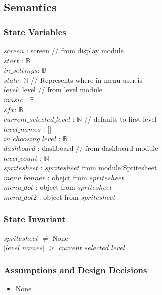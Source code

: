 \documentclass[12pt]{article}
\begin{document}
\subsection {Semantics}

\subsubsection {State Variables}

$screen$ : screen // from display module\\
$start$ : $\mathbb{B}$ \\
$in\_settings$: $\mathbb{B}$ \\
$state$: $\mathbb{N}$ // Represents where in menu user is\\
$level$: level // from level module\\
$music$ : $\mathbb{B}$ \\
$sfx$: $\mathbb{B}$ \\
$current\_selected\_level$ : $\mathbb{N}$ // defaults to first level\\
$level\_names$ : [] \\
$in\_choosing\_level$ : $\mathbb{B}$ \\
$dashboard$ : dashboard // from dashboard module\\
$level\_count$ : $\mathbb{N}$ \\
$spritesheet$ : $spritesheet$ from module Spritesheet \\
$menu\_banner$ : obejct from $spritesheet$ \\
$menu\_dot$ : object from $spritesheet$ \\
$menu\_dot2$ : object from $spritesheet$

\subsubsection {State Invariant}

$spritesheet$ $\neq$ None \\
$|level\_names|$ $\geq$  $current\_selected\_level$

\subsubsection {Assumptions and Design Decisions}

\begin{itemize}
    \item None
\end{itemize}
\end{document}
